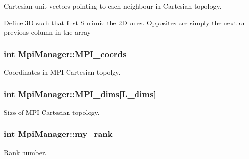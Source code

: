 Cartesian unit vectors pointing to each neighbour in Cartesian topology. 

Define 3D such that first 8 mimic the 2D ones. Opposites are simply the next or previous column in the array. 
\subsubsection[{\texorpdfstring{M\+P\+I\+\_\+coords}{MPI_coords}}]{\setlength{\rightskip}{0pt plus 5cm}int Mpi\+Manager\+::\+M\+P\+I\+\_\+coords\hspace{0.3cm}{\ttfamily [static]}}\hypertarget{class_mpi_manager_a677a39e98470d3945248a66cf0bc3ec3}{}\label{class_mpi_manager_a677a39e98470d3945248a66cf0bc3ec3}


Coordinates in M\+PI Cartesian topolgy. 

\subsubsection[{\texorpdfstring{M\+P\+I\+\_\+dims}{MPI_dims}}]{\setlength{\rightskip}{0pt plus 5cm}int Mpi\+Manager\+::\+M\+P\+I\+\_\+dims\mbox{[}{\bf L\+\_\+dims}\mbox{]}}\hypertarget{class_mpi_manager_a8e2e923e656c338148d42517323c9586}{}\label{class_mpi_manager_a8e2e923e656c338148d42517323c9586}


Size of M\+PI Cartesian topology. 

\subsubsection[{\texorpdfstring{my\+\_\+rank}{my_rank}}]{\setlength{\rightskip}{0pt plus 5cm}int Mpi\+Manager\+::my\+\_\+rank\hspace{0.3cm}{\ttfamily [static]}}\hypertarget{class_mpi_manager_a8329212abc23e5fa3e32e961b7823b5b}{}\label{class_mpi_manager_a8329212abc23e5fa3e32e961b7823b5b}


Rank number. 


